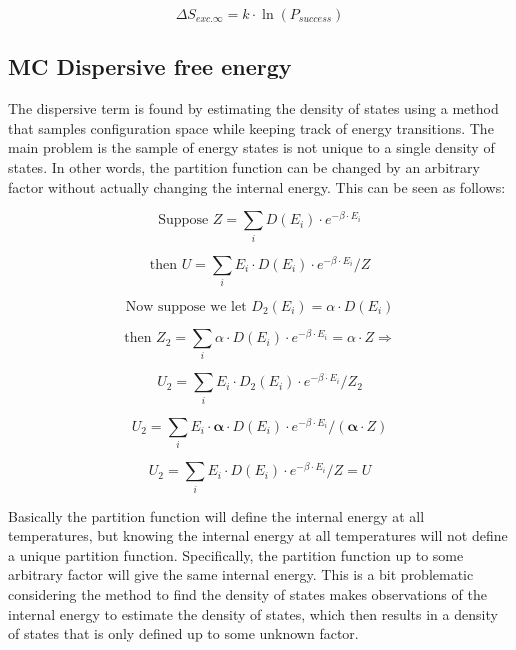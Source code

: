 \begin{equation}\label{eq:MCHS26}
\Delta S_{exc.\infty}=k\cdot \ln(P_{success})
\end{equation}

\subsection{MC Dispersive free energy}
The dispersive term is found by estimating the density of states using a method that samples configuration space while keeping track of energy transitions. The main problem is the sample of energy states is not unique to a single density of states. In other words, the partition function can be changed by an arbitrary factor without actually changing the internal energy. This can be seen as follows:

\begin{equation}\label{eq:MCDISP1}
\text{Suppose }Z=\sum_i D(E_i)\cdot e^{-\beta\cdot E_i}
\end{equation}

\begin{equation}\label{eq:MCDISP2}
\text{then }U=\sum_i E_i\cdot D(E_i)\cdot e^{-\beta\cdot E_i}/Z
\end{equation}

\begin{equation}\label{eq:MCDISP3}
\text{Now suppose we let }D_2(E_i)=\alpha\cdot D(E_i)
\end{equation}

\begin{equation}\label{eq:MCDISP4}
\text{then }Z_2=\sum_i \alpha\cdot D(E_i)\cdot e^{-\beta\cdot E_i}=\alpha\cdot Z\Rightarrow
\end{equation}

\begin{equation}\label{eq:MCDISP5}
U_2=\sum_i E_i\cdot D_2(E_i)\cdot e^{-\beta\cdot E_i}/Z_2
\end{equation}


\begin{equation}\label{eq:MCDISP6}
U_2=\sum_i E_i\cdot \boldsymbol{\alpha}\cdot D(E_i)\cdot e^{-\beta\cdot E_i}/(\boldsymbol{\alpha}\cdot Z)
\end{equation}


\begin{equation}\label{eq:MCDISP7}
U_2=\sum_i E_i\cdot D(E_i)\cdot e^{-\beta\cdot E_i}/Z=U
\end{equation}

Basically the partition function will define the internal energy at all temperatures, but knowing the internal energy at all temperatures will not define a unique partition function. Specifically, the partition function up to some arbitrary factor will give the same internal energy. This is a bit problematic considering the method to find the density of states makes observations of the internal energy to estimate the density of states, which then results in a density of states that is only defined up to some unknown factor.


